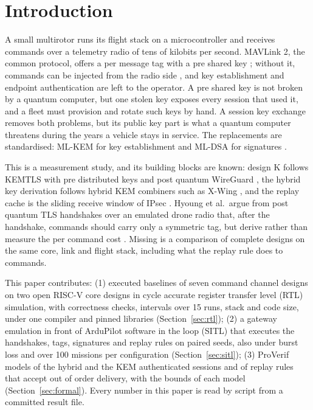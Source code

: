 \documentclass[conference]{IEEEtran}
\begin{document}
\section{Introduction}
A small multirotor runs its flight stack on a microcontroller and receives commands over a telemetry radio of tens of kilobits per second. MAVLink 2, the common protocol, offers a per message tag with a pre shared key \cite{mavsign}; without it, commands can be injected from the radio side \cite{kwon18,koubaa19}, and key establishment and endpoint authentication are left to the operator. A pre shared key is not broken by a quantum computer, but one stolen key exposes every session that used it, and a fleet must provision and rotate such keys by hand. A session key exchange removes both problems, but its public key part is what a quantum computer threatens during the years a vehicle stays in service. The replacements are standardised: ML-KEM for key establishment \cite{fips203} and ML-DSA for signatures \cite{fips204}.

This is a measurement study, and its building blocks are known: design K follows KEMTLS with pre distributed keys and post quantum WireGuard \cite{kemtlspdk21,pqwg21}, the hybrid key derivation follows hybrid KEM combiners such as X-Wing \cite{xwing24}, and the replay cache is the sliding receive window of IPsec \cite{rfc4303}. Hyoung et al.\ argue from post quantum TLS handshakes over an emulated drone radio that, after the handshake, commands should carry only a symmetric tag, but derive rather than measure the per command cost \cite{hyoung26}. Missing is a comparison of complete designs on the same core, link and flight stack, including what the replay rule does to commands.

This paper contributes:
(1) executed baselines of seven command channel designs on two open RISC-V core designs in cycle accurate register transfer level (RTL) simulation, with correctness checks, intervals over 15 runs, stack and code size, under one compiler and pinned libraries (Section~\ref{sec:rtl});
(2) a gateway emulation in front of ArduPilot software in the loop (SITL) that executes the handshakes, tags, signatures and replay rules on paired seeds, also under burst loss and over 100 missions per configuration (Section~\ref{sec:sitl});
(3) ProVerif models of the hybrid and the KEM authenticated sessions and of replay rules that accept out of order delivery, with the bounds of each model (Section~\ref{sec:formal}).
Every number in this paper is read by script from a committed result file.
\end{document}
